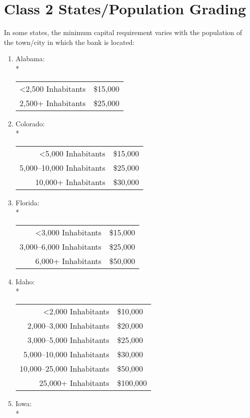 ﻿\documentclass[12pt]{report}
\begin{document}
\section{Class 2 States/Population Grading}
In some states, the minimum capital requirement varies with the population of the town/city in which the bank is located:

    \begin{enumerate}
        \item Alabama:\\*
            \begin{tabular}{r|l}
                <2,500 Inhabitants & \$15,000\\
                2,500+ Inhabitants & \$25,000
            \end{tabular}
        \item Colorado:\\*
            \begin{tabular}{r|l}
                <5,000 Inhabitants & \$15,000\\
                5,000--10,000 Inhabitants & \$25,000\\
                10,000+ Inhabitants & \$30,000
            \end{tabular}
        \item Florida:\\*
            \begin{tabular}{r|l}
                <3,000 Inhabitants & \$15,000\\
                3,000--6,000 Inhabitants & \$25,000\\
                6,000+ Inhabitants & \$50,000
            \end{tabular}
        \item Idaho:\\*
            \begin{tabular}{r|l}
                <2,000 Inhabitants & \$10,000\\
                2,000--3,000 Inhabitants & \$20,000\\
                3,000--5,000 Inhabitants & \$25,000\\
                5,000--10,000 Inhabitants & \$30,000\\
                10,000--25,000 Inhabitants & \$50,000\\
                25,000+ Inhabitants & \$100,000
            \end{tabular}
        \item Iowa:\\*

\end{enumerate}
\end{document}
